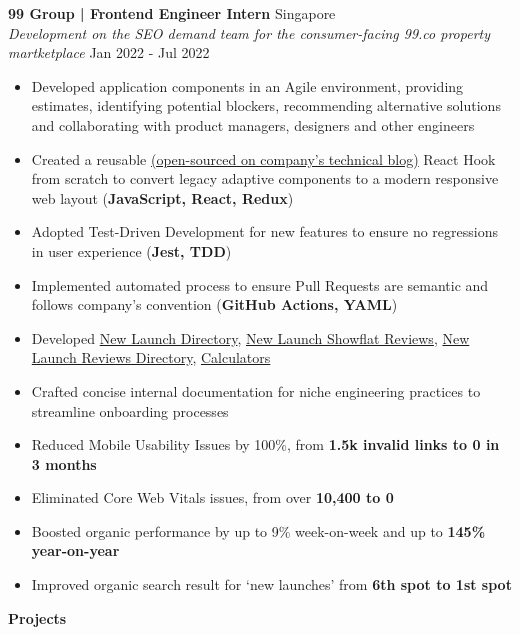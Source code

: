 \documentclass[a4paper]{article}
\newcommand{\lineunder} {
    \vspace*{-8pt} \\
    \hspace*{-12pt} \hrulefill \\
}
\newcommand{\header} [1] {
    {\hspace*{-12pt}\vspace*{6pt} \large\textbf{#1}}
    \vspace*{-6pt} \lineunder
}
\begin{document}
\textbf{99 Group | Frontend Engineer Intern} \hfill Singapore\\
\textit{Development on the SEO demand team for the consumer-facing 99.co property martketplace} \hfill Jan 2022 - Jul 2022\\
\vspace{-2mm}
\begin{itemize} \itemsep 1pt
    \item Developed application components in an Agile environment, providing estimates, identifying potential blockers, recommending alternative solutions and collaborating with product managers, designers and other engineers
	\item Created a reusable \href{https://medium.com/99dotco/adaptive-to-responsive-in-1-react-hook-4d1ce93e1488}{(open-sourced on company's technical blog)} React Hook from scratch to convert legacy adaptive components to a modern responsive web layout (\textbf{JavaScript, React, Redux})
	\item Adopted Test-Driven Development for new features to ensure no regressions in user experience (\textbf{Jest, TDD})
	\item Implemented automated process to ensure Pull Requests are semantic and follows company’s convention (\textbf{GitHub Actions, YAML})
	\item Developed \href{https://www.99.co/singapore/new-launches}{New Launch Directory}, \href{https://www.99.co/singapore/condos-apartments/reviews/liv-mb}{New Launch Showflat Reviews}, \href{https://www.99.co/singapore/condos-apartments/reviews}{New Launch Reviews Directory}, \href{https://www.99.co/singapore/tools/tdsr-calculator}{Calculators}
	\item Crafted concise internal documentation for niche engineering practices to streamline onboarding processes
	\item Reduced Mobile Usability Issues by 100\%, from \textbf{1.5k invalid links to 0 in 3 months}
	\item Eliminated Core Web Vitals issues, from over \textbf{10,400 to 0}
	\item Boosted organic performance by up to 9\% week-on-week and up to \textbf{145\% year-on-year}
	\item Improved organic search result for ‘new launches’ from \textbf{6th spot to 1st spot}
\end{itemize}

\header{Projects}
\vspace{1mm}
\end{document}
